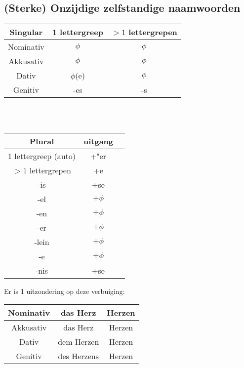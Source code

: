 \documentclass[main.tex]{subfiles}
\begin{document}
\subsection{(Sterke) Onzijdige zelfstandige naamwoorden}
\begin{minipage}[t]{0.5\textwidth}
\begin{tabular}{|c|c|c|}
\hline 
\rowcolor{gray}
Singular & 1 lettergreep & $>1$ lettergrepen \\ 
\hline 
\cellcolor[gray]{0.8}Nominativ & $\phi$ & $\phi$\\ 
\hline 
\cellcolor[gray]{0.8}Akkusativ & $\phi$ & $\phi$\\ 
\hline 
\cellcolor[gray]{0.8}Dativ & $\phi$(e) & $\phi$ \\ 
\hline 
\cellcolor[gray]{0.8}Genitiv & -es & -s \\ 
\hline 
\end{tabular} 
\\
\\
\begin{tabular}{|c|c|c|}
\hline 
\rowcolor{gray}
Plural & uitgang \\ 
\hline 
\cellcolor[gray]{0.8}1 lettergreep (auto) & +"er \\ 
\hline 
\cellcolor[gray]{0.8} $>1$ lettergrepen & +e \\ 
\hline 
\cellcolor[gray]{0.8} -is & +se \\ 
\hline 
\cellcolor[gray]{0.8} -el & $+\phi$ \\ 
\hline 
\cellcolor[gray]{0.8} -en & $+\phi$ \\ 
\hline 
\cellcolor[gray]{0.8} -er & $+\phi$ \\ 
\hline 
\cellcolor[gray]{0.8} -lein & $+\phi$ \\ 
\hline 
\cellcolor[gray]{0.8} -e & $+\phi$ \\ 
\hline 
\cellcolor[gray]{0.8} -nis & +se \\ 
\hline 
\end{tabular} 
\end{minipage}
\begin{minipage}{0.5\textwidth}
Er is 1 uitzondering op deze verbuiging:\\
\begin{tabular}{|c|c|c|}
\hline 
\cellcolor[gray]{0.8}Nominativ & das Herz & Herzen\\ 
\hline 
\cellcolor[gray]{0.8}Akkusativ & das Herz & Herzen\\ 
\hline 
\cellcolor[gray]{0.8}Dativ & dem Herzen & Herzen\\ 
\hline 
\cellcolor[gray]{0.8}Genitiv & des Herzens & Herzen\\ 
\hline 
\end{tabular}
\end{minipage}
\end{document}
